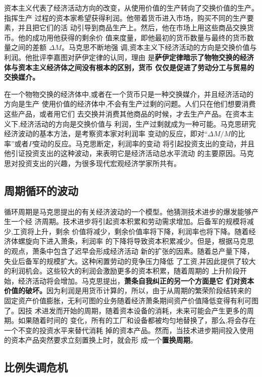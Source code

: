 资本主义代表了经济活动方向的改变，从使用价值的生产转向了交换价值的生产。指挥生产
过程的资本家希望获得利润。他带着货币进入市场，购买不同的生产要素，并且把它们的活
动引导到商品生产上。然后，他在市场上用这些商品交换货币。他的成功用他获得的剩余价
值来度量，即他最初的货币数量与最终的货币数量之间的差额 $\Delta M$。马克思不断地强
调,资本主义下经济活动的方向是交换价值与利润。他批评李嘉图对萨伊定律的认同，理由
是\textbf{萨伊定律暗示了物物交换的经济体与资本主义经济体之间没有根本的区别，货币
  仅仅是促进了劳动分工与贸易的交换媒介。}

在一个物物交换的经济体中,或者在一个货币只是一种交换媒介，并且经济活动的方向是生产
使用价值的经济体中,不会有生产过剩的问题。人们只在他们想要消费这些产品，或者用它们
去交换并消费其他商品的时候，才去生产产品。在资本主义下,经济活动的方向是交换价值与
利润，生产过剩就成为一种可能。马克思研究经济波动的基本方法，是考察资本家对利润率
变动的反应，即对“$\Delta M/M$的比率”或者$P$变动的反应。马克思断定，利润率的变动
将引起投资支出的变动，并且他引证投资支出的这种波动，来表明它是经济活动总水平流动
的主要原因。马克思对投资支出的兴趣，为很多现代宏观经济学家所共有。

\subsection{周期循环的波动}

循环周期是马克思提出的有关经济波动的一个模型。他猜测技术进步的爆发能够产生一个经
济周期。技术进步将引起资本积累和劳动需求增加。后备军的规模将减少,工资将上升，剩余
价值将减少，剩余价值率将下降，利润率也将下降。随着经济体螺旋向下进入萧条，利润率
的下降将导致资本积累减少。但是，根据马克思的观点，萧条中包含了迟早会形成经济活动
新的扩张的因素。随着总产量下降，失业后备军的规模扩大。这种闲置劳动的竞争压力降低
了工资,并因此提供了较大的利润机会。这些较大的利润会激励更多的资本积累，随着周期的
上升阶段开始，经济活动将会增加。马克思提出，\textbf{萧条自我纠正的另一个方面是它
  们对资本价值的破坏。}因为利润是用货币计算的，所以，由于从周期的繁荣阶段结转来的
固定资产价值膨胀，无利可图的业务随着经济萧条期间资产价值降低变得有利可图了。因技
术进发而开始的周期，随着资本设备的消耗，未来可能会产生更多的周期。如果随着时间的
变化，所有的工厂和设备都被均匀地替换了，那么,将会存在一个不变的投资水平来替代消耗
掉的资本产品。然而，当技术进步期间投入使用的资本产品突然要求立刻置换上时，就会形
成一个\textbf{置换周期}。

\subsection{比例失调危机}

